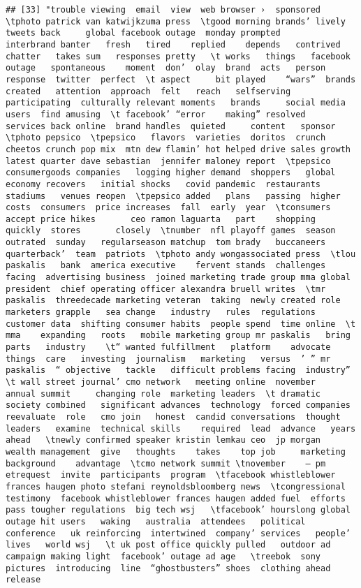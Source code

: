 \documentclass[
]{article}
\begin{document}
\begin{verbatim}
## [33] "trouble viewing  email  view  web browser ›  sponsored   \tphoto patrick van katwijkzuma press  \tgood morning brands’ lively tweets back     global facebook outage  monday prompted      interbrand banter   fresh   tired    replied    depends   contrived  chatter   takes sum   responses pretty   \t works   things   facebook outage   spontaneous    moment  don’  olay  brand  acts   person    response  twitter  perfect  \t aspect     bit played    “wars”  brands  created   attention  approach  felt   reach   selfserving  participating  culturally relevant moments   brands     social media users  find amusing  \t facebook’ “error    making” resolved   services back online  brand handles  quieted     content   sponsor  \tphoto pepsico  \tpepsico   flavors  varieties  doritos  crunch cheetos crunch pop mix  mtn dew flamin’ hot helped drive sales growth   latest quarter dave sebastian  jennifer maloney report  \tpepsico   consumergoods companies   logging higher demand  shoppers   global economy recovers   initial shocks   covid pandemic  restaurants stadiums   venues reopen  \tpepsico added   plans   passing  higher costs  consumers  price increases  fall  early  year  \tconsumers     accept price hikes       ceo ramon laguarta   part    shopping  quickly  stores       closely  \tnumber  nfl playoff games  season   outrated  sunday   regularseason matchup  tom brady   buccaneers   quarterback’  team  patriots  \tphoto andy wongassociated press  \tlou paskalis   bank  america executive    fervent stands  challenges facing  advertising business  joined marketing trade group mma global  president  chief operating officer alexandra bruell writes  \tmr paskalis  threedecade marketing veteran  taking  newly created role  marketers grapple   sea change   industry   rules  regulations   customer data  shifting consumer habits  people spend  time online  \t mma    expanding   roots   mobile marketing group mr paskalis   bring   parts   industry    \t“ wanted fulfillment   platform    advocate  things  care   investing  journalism   marketing   versus  ’ ” mr paskalis  “ objective   tackle   difficult problems facing  industry”  \t wall street journal’ cmo network   meeting online  november   annual summit     changing role  marketing leaders  \t dramatic   society combined   significant advances  technology  forced companies  reevaluate  role   cmo join   honest  candid conversations  thought leaders   examine  technical skills    required  lead  advance   years ahead   \tnewly confirmed speaker kristin lemkau ceo  jp morgan wealth management  give   thoughts    takes    top job     marketing background    advantage  \tcmo network summit \tnovember    – pm etrequest  invite  participants  program  \tfacebook whistleblower frances haugen photo stefani reynoldsbloomberg news  \tcongressional testimony  facebook whistleblower frances haugen added fuel  efforts  pass tougher regulations  big tech wsj   \tfacebook’ hourslong global outage hit users   waking   australia  attendees   political conference   uk reinforcing  intertwined  company’ services   people’ lives   world wsj   \t uk post office quickly pulled   outdoor ad campaign making light  facebook’ outage ad age   \treebok  sony pictures  introducing  line  “ghostbusters” shoes  clothing ahead   release    
\end{verbatim}
\end{document}
